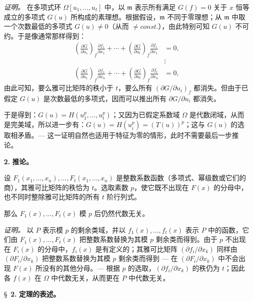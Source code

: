 \documentclass[11pt]{article}
\begin{document}
\noindent\textit{证明。}
在多项式环 $\Omega[u_1,\ldots,u_t]$ 中，以 $\mathfrak{m}$ 表示所有满足 $G(f) = 0$ 关于 $x$ 恒等成立的多项式 $G(u)$ 所构成的素理想。根据假设，$\mathfrak{m}$ 不同于零理想；从 $\mathfrak{m}$ 中取一个次数最低的多项式 $G(u) \neq 0$（从而 $\neq {const.}$），由此特别可知 $G(u)$ 不可约。于是像通常那样得到：
\[
\begin{aligned}
\left(\frac{\partial G}{\partial u_1}\right)_{f}\frac{\partial f_1}{\partial x_1}
 +\cdots+
\left(\frac{\partial G}{\partial u_t}\right)_{f}\frac{\partial f_t}{\partial x_1}&=0,\\[-1mm]
&\vdots\\[-1mm]
\left(\frac{\partial G}{\partial u_1}\right)_{f}\frac{\partial f_1}{\partial x_n}
 +\cdots+
\left(\frac{\partial G}{\partial u_t}\right)_{f}\frac{\partial f_t}{\partial x_n}&=0,
\end{aligned}
\]
由此可知，要么雅可比矩阵的秩小于 $t$，要么所有 $\left(\partial G/\partial u_i\right)_{f}$ 都消失。但由于已假定 $G(u)$ 是次数最低的多项式，因而可以推出所有 $\partial G/\partial u_i$ 都消失。

于是得到：$G(u)=H(u_1^p,\ldots,u_t^p)$；又因为已假定系数域 $\Omega$ 是代数闭域，从而是完美域，所以进一步有：$G(u)=H(u_i^p)=(T(u))^p$；这与 $G(u)$ 的选取相矛盾。--- 这一证明自然也适用于特征为零的情形，此时不需要最后一步推论。

\medskip\noindent\textbf{2.} \textbf{推论。}

设 $F_1(x_1,\ldots,x_n),\ldots,F_t(x_1,\ldots,x_n)$ 是整数系数函数（多项式、幂级数或它们的商），其雅可比矩阵的秩恰为 $t$。选取素数 $p$，使它既不出现在 $F(x)$ 的分母中，也不同时整除雅可比矩阵的所有 $t$ 阶行列式。

那么 $F_1(x),\ldots,F_t(x)$ 模 $p$ 后仍然代数无关。

\noindent\textit{证明。}
以 $P$ 表示模 $p$ 的剩余类域，并以 $f_1(x),\ldots,f_t(x)$ 表示 $P$ 中的函数，它们由 $F_1(x),\ldots,F_t(x)$ 把整数系数替换为其模 $p$ 剩余类而得到。由于 $p$ 不出现在 $F_i(x)$ 的分母中，$f_i(x)$ 是有定义的；其雅可比矩阵 $(\partial f_i/\partial x_k)$ 同样由 $(\partial F_i/\partial x_k)$ 把整数系数替换为其模 $p$ 剩余类而得到 --- 在 $(\partial F_i/\partial x_k)$ 中不会出现 $F(x)$ 所没有的其他分母。--- 根据 $p$ 的选取，$(\partial f_i/\partial x_k)$ 的秩仍为 $t$；因此各 $f(x)$ 在 $\Omega$ 中代数无关，从而更在 $P$ 中代数无关。

\bigskip
\S~\textbf{2.}
\textbf{定理的表述。}

\smallskip
\end{document}
